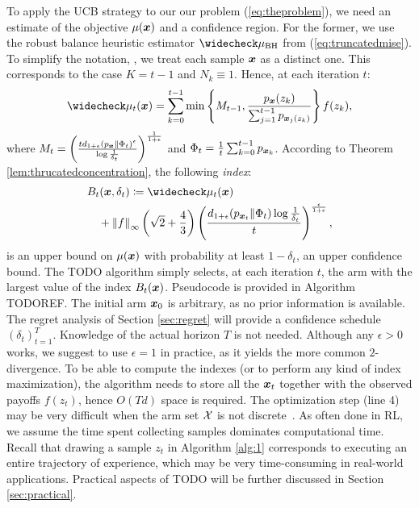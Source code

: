 \documentclass{article}
\makeatletter
\DeclareRobustCommand{\algoname}{TODO\@\xspace}
\makeatother
\begin{document}
To apply the UCB strategy to our our problem (\ref{eq:theproblem}), we need an estimate of the objective $\mu(\boldsymbol{x})$ and a confidence region. 
For the former, we use the robust balance heuristic estimator $\wc{\mu}_{\text{BH}}$ from (\ref{eq:truncatedmise}). To simplify the notation, \wlg, we treat each sample $\boldsymbol{x}$ as a distinct one. This corresponds to the case $K=t-1$ and $N_k\equiv1$. Hence, at each iteration $t$:
\begin{align}
	\wc{\mu}_t(\vx) = \sum_{k=0}^{t-1}
	\min\left\{M_{t-1}, \frac{p_{\vx}(z_k)}
	{\sum_{j=1}^{t-1}p_{\vx_j(z_k)}}\right\}f(z_k),
\end{align}
where ${M_{t} = \left(\frac{td_{1+\epsilon}(p_{\boldsymbol{x}}\|\Phi_t)^{\epsilon}}{\log\frac{1}{\delta_t}}\right)^{\frac{1}{1+\epsilon}}}$ and ${\Phi_t = \frac{1}{t}\sum_{k=0}^{t-1}p_{\boldsymbol{x}_k}}$.
According to Theorem \ref{lem:thrucatedconcentration}, the following \textit{index}:
\begin{align}
	&B_t(\vx,\delta_t) \coloneqq 
	\wc{\mu}_t(\vx) \nonumber\\
	&\quad+\norm[\infty]{f}\left(\sqrt{2}+\frac{4}{3}\right)
	\left(\frac{d_{1+\epsilon}(p_{\vx_t}\|\Phi_{t})\log\frac{1}{\delta_t}}{t}\right)^{\frac{\epsilon}{1+\epsilon}},
\end{align}
is an upper bound on $\mu(\boldsymbol{x})$ with probability at least $1-\delta_t$, \ie an upper confidence bound. The \algoname algorithm simply selects, at each iteration $t$, the arm with the largest value of the index $B_t(\boldsymbol{x})$. Pseudocode is provided in Algorithm TODOREF. The initial arm $\boldsymbol{x}_0$ is arbitrary, as no prior information is available. The regret analysis of Section \ref{sec:regret} will provide a confidence schedule $(\delta_t)_{t=1}^T$. Knowledge of the actual horizon $T$ is not needed. Although any $\epsilon>0$ works, we suggest to use $\epsilon=1$ in practice, as it yields the more common $2$-\Renyi divergence. To be able to compute the indexes (or to perform any kind of index maximization), the algorithm needs to store all the $\boldsymbol{x}_t$ together with the observed payoffs $f(z_t)$, hence $O(Td)$ space is required. The optimization step (line 4) may be very difficult when the arm set $\mathcal{X}$ is not discrete~\citep[\cf][]{srinivas2009gaussian}. As often done in RL, we assume the time spent collecting samples dominates computational time. Recall that drawing a sample $z_t$ in Algorithm \ref{alg:1} corresponds to executing an entire trajectory of experience, which may be very time-consuming in real-world applications. Practical aspects of \algoname will be further discussed in Section \ref{sec:practical}.
\end{document}
